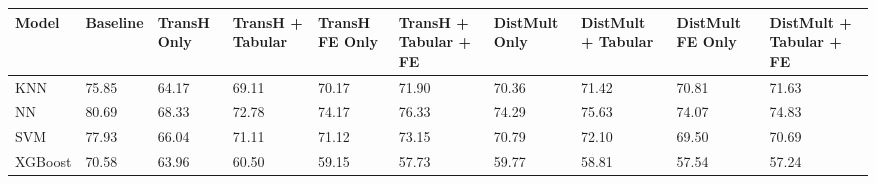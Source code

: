 \begin{tabular}{llllllllll}
\toprule
Model & Baseline & TransH Only & TransH + Tabular & TransH FE Only & TransH + Tabular + FE & DistMult Only & DistMult + Tabular & DistMult FE Only & DistMult + Tabular + FE \\
\midrule
KNN & 75.85 & 64.17 & 69.11 & 70.17 & 71.90 & 70.36 & 71.42 & 70.81 & 71.63 \\
NN & 80.69 & 68.33 & 72.78 & 74.17 & 76.33 & 74.29 & 75.63 & 74.07 & 74.83 \\
SVM & 77.93 & 66.04 & 71.11 & 71.12 & 73.15 & 70.79 & 72.10 & 69.50 & 70.69 \\
XGBoost & 70.58 & 63.96 & 60.50 & 59.15 & 57.73 & 59.77 & 58.81 & 57.54 & 57.24 \\
\bottomrule
\end{tabular}
